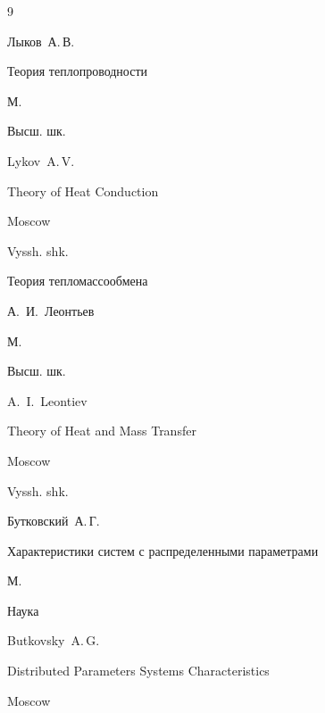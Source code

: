 \begin{thebibliography}{9}




\by  Лыков~А.\,В.

\book Теория теплопроводности

\publaddr М.

\publ Высш. шк.



\misctransl

\by Lykov~A.\,V.

\book Theory of Heat Conduction 

\publaddr Moscow 

\publ Vyssh. shk.






\book Теория тепломассообмена

\ed А.~И.~Леонтьев

\publaddr М.

\publ Высш. шк.



\misctransl

\ed A.~I.~Leontiev

\book Theory of Heat and Mass Transfer

\publaddr Moscow 

\publ Vyssh. shk.








\by Бутковский~А.\,Г.

\book Характеристики систем с распределенными параметрами

\publaddr М.

\publ Наука



\misctransl

\by Butkovsky~A.\,G.

\book Distributed Parameters Systems Characteristics

\publaddr Moscow


\end{thebibliography}
